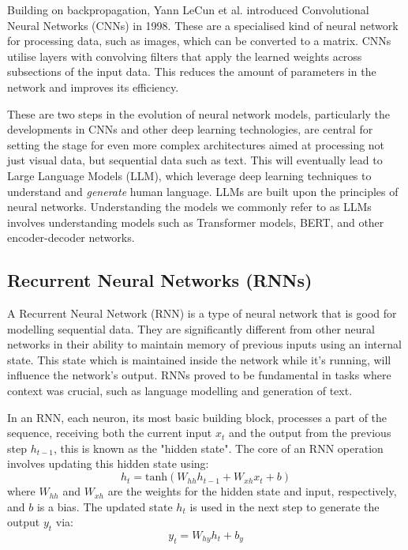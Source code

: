 Building on backpropagation, Yann LeCun et al. \cite{lecun_gradient-based_1998} introduced Convolutional Neural Networks (CNNs) in 1998. These are a specialised kind of neural network for processing data, such as images, which can be converted to a matrix. CNNs utilise layers with convolving filters that apply the learned weights across subsections of the input data. This reduces the amount of parameters in the network and improves its efficiency.


These are two steps in the evolution of neural network models, particularly the developments in CNNs and other deep learning technologies, are central for setting the stage for even more complex architectures aimed at processing not just visual data, but sequential data such as text. This will eventually lead to Large Language Models (\gls{LLM}), which leverage deep learning techniques to understand and \textit{generate} human language. LLMs are built upon the principles of neural networks. Understanding the models we commonly refer to as LLMs involves understanding models such as Transformer models, BERT, and other encoder-decoder networks.


\subsection{Recurrent Neural Networks (RNNs)}


A Recurrent Neural Network (\gls{RNN}) is a type of neural network that is good for modelling sequential data. They are significantly different from other neural networks in their ability to maintain memory of previous inputs using an internal state. This state which is maintained inside the network while it’s running, will influence the network’s output. RNNs proved to be fundamental in tasks where context was crucial, such as language modelling and generation of text.


In an RNN, each neuron, its most basic building block, processes a part of the sequence, receiving both the current input \(x_t\) and the output from the previous step \(h_{t-1}\), this is known as the "hidden state". The core of an RNN operation involves updating this hidden state using:
\[
h_t = \text{tanh}(W_{hh} h_{t-1} + W_{xh} x_t + b)
\]
where \(W_{hh}\) and \(W_{xh}\) are the weights for the hidden state and input, respectively, and \(b\) is a bias. The updated state \(h_t\) is used in the next step to generate the output \(y_t\) via:
\[
y_t = W_{hy} h_t + b_y
\]




